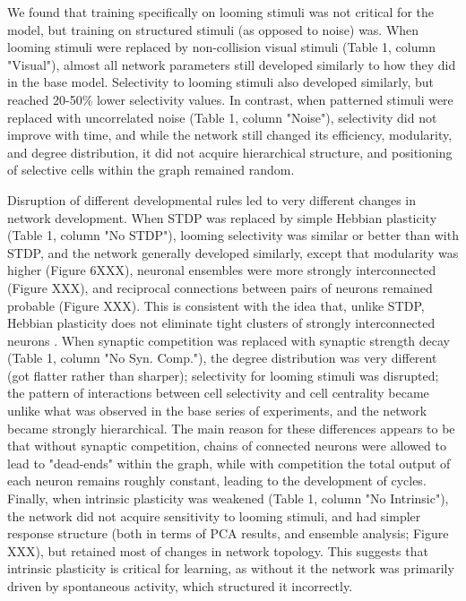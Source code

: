 \documentclass{article}
\begin{document}
We found that training specifically on looming stimuli was not critical for the model, but training on structured stimuli (as opposed to noise) was. When looming stimuli were replaced by non-collision visual stimuli (Table 1, column "Visual"), almost all network parameters still developed similarly to how they did in the base model. Selectivity to looming stimuli also developed similarly, but reached 20-50\% lower selectivity values. In contrast, when patterned stimuli were replaced with uncorrelated noise (Table 1, column "Noise"), selectivity did not improve with time, and while the network still changed its efficiency, modularity, and degree distribution, it did not acquire hierarchical structure, and positioning of selective cells within the graph remained random.

Disruption of different developmental rules led to very different changes in network development. When STDP was replaced by simple Hebbian plasticity (Table 1, column "No STDP"), looming selectivity was similar or better than with STDP, and the network generally developed similarly, except that modularity was higher (Figure 6XXX), neuronal ensembles were more strongly interconnected (Figure XXX), and reciprocal connections between pairs of neurons remained probable (Figure XXX). This is consistent with the idea that, unlike STDP, Hebbian plasticity does not eliminate tight clusters of strongly interconnected neurons \citep{fiete2010chains}. When synaptic competition was replaced with synaptic strength decay (Table 1, column "No Syn. Comp."), the degree distribution was very different (got flatter rather than sharper); selectivity for looming stimuli was disrupted; the pattern of interactions between cell selectivity and cell centrality became unlike what was observed in the base series of experiments, and the network became strongly hierarchical. The main reason for these differences appears to be that without synaptic competition, chains of connected neurons were allowed to lead to "dead-ends" within the graph, while with competition the total output of each neuron remains roughly constant, leading to the development of cycles. Finally, when intrinsic plasticity was weakened (Table 1, column "No Intrinsic"), the network did not acquire sensitivity to looming stimuli, and had simpler response structure (both in terms of PCA results, and ensemble analysis; Figure XXX), but retained most of changes in network topology. This suggests that intrinsic plasticity is critical for learning, as without it the network was primarily driven by spontaneous activity, which structured it incorrectly.
\end{document}
